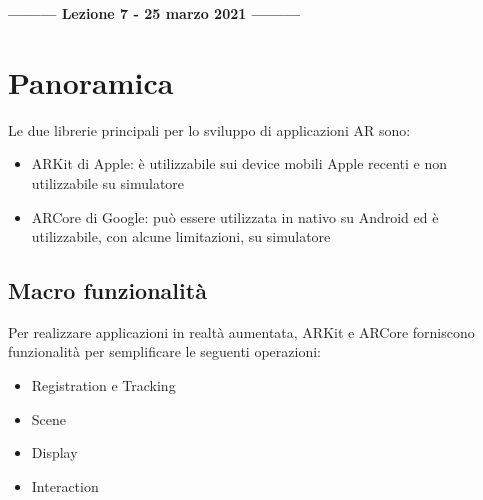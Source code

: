 \begin{center}
    \textbf{--------- Lezione 7 - 25 marzo 2021 ---------}
\end{center}

\section{Panoramica}
Le due librerie principali per lo sviluppo di applicazioni AR sono:
\begin{itemize}
    \item ARKit di Apple: è utilizzabile sui device mobili Apple recenti e non utilizzabile su simulatore
    \item ARCore di Google: può essere utilizzata in nativo su Android ed è utilizzabile, con alcune limitazioni, su simulatore
\end{itemize}
\subsection{Macro funzionalità}
Per realizzare applicazioni in realtà aumentata, ARKit e ARCore forniscono funzionalità per semplificare le seguenti operazioni:
\begin{itemize}
    \item Registration e Tracking
    \item Scene
    \item Display
    \item Interaction
\end{itemize}

